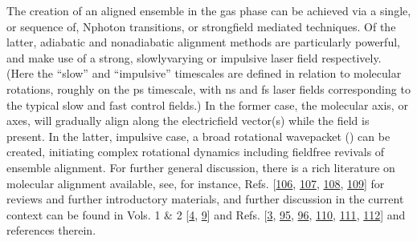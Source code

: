 \documentclass[letterpaper,table,10pt,english]{jupyterBook}
\begin{document}
\sphinxAtStartPar
The creation of an aligned ensemble in the gas phase can be achieved via a single, or sequence of, N\sphinxhyphen{}photon transitions, or strong\sphinxhyphen{}field mediated techniques. Of the latter, adiabatic and non\sphinxhyphen{}adiabatic alignment methods are particularly powerful, and make use of a strong, slowly\sphinxhyphen{}varying or impulsive laser field respectively. (Here the “slow” and “impulsive” time\sphinxhyphen{}scales are defined in relation to molecular rotations, roughly on the ps time\sphinxhyphen{}scale, with ns and fs laser fields corresponding to the typical slow and fast control fields.) In the former case, the molecular axis, or axes, will gradually align along the electric\sphinxhyphen{}field vector(s) while the field is present. In the latter, impulsive case, a broad rotational wavepacket ({\hyperref[\detokenize{backmatter/glossary:term-RWP}]{}}) can be created, initiating complex rotational dynamics including field\sphinxhyphen{}free revivals of ensemble alignment. For further general discussion, there is a rich literature on molecular alignment available, see, for instance, Refs. {[}\hyperlink{cite.backmatter/bibliography:id900}{106}, \hyperlink{cite.backmatter/bibliography:id643}{107}, \hyperlink{cite.backmatter/bibliography:id726}{108}, \hyperlink{cite.backmatter/bibliography:id998}{109}{]} for reviews and further introductory materials, and further discussion in the current context can be found in  Vols. 1 \& 2 {[}\hyperlink{cite.backmatter/bibliography:id675}{4}, \hyperlink{cite.backmatter/bibliography:id676}{9}{]} and Refs. {[}\hyperlink{cite.backmatter/bibliography:id684}{3}, \hyperlink{cite.backmatter/bibliography:id838}{95}, \hyperlink{cite.backmatter/bibliography:id934}{96}, \hyperlink{cite.backmatter/bibliography:id832}{110}, \hyperlink{cite.backmatter/bibliography:id833}{111}, \hyperlink{cite.backmatter/bibliography:id662}{112}{]} and references therein.
\end{document}
